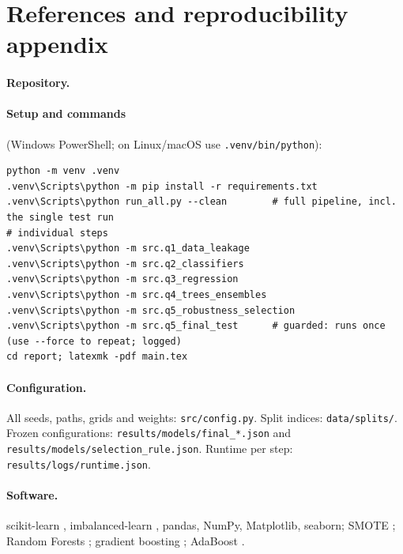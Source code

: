 \section{References and reproducibility appendix}
\label{sec:repro}

\paragraph{Repository.} \RepoURL

\paragraph{Setup and commands} (Windows PowerShell; on Linux/macOS use \texttt{.venv/bin/python}):
{\footnotesize
\begin{verbatim}
python -m venv .venv
.venv\Scripts\python -m pip install -r requirements.txt
.venv\Scripts\python run_all.py --clean        # full pipeline, incl. the single test run
# individual steps
.venv\Scripts\python -m src.q1_data_leakage
.venv\Scripts\python -m src.q2_classifiers
.venv\Scripts\python -m src.q3_regression
.venv\Scripts\python -m src.q4_trees_ensembles
.venv\Scripts\python -m src.q5_robustness_selection
.venv\Scripts\python -m src.q5_final_test      # guarded: runs once (use --force to repeat; logged)
cd report; latexmk -pdf main.tex
\end{verbatim}
}

\paragraph{Configuration.} All seeds, paths, grids and weights: \nolinkurl{src/config.py}. Split indices:
\nolinkurl{data/splits/}. Frozen configurations: \nolinkurl{results/models/final_*.json} and
\nolinkurl{results/models/selection_rule.json}. Runtime per step: \nolinkurl{results/logs/runtime.json}.

\paragraph{Software.} scikit-learn \cite{pedregosa2011scikit}, imbalanced-learn \cite{lemaitre2017imbalanced},
pandas, NumPy, Matplotlib, seaborn; SMOTE \cite{chawla2002smote}; Random Forests \cite{breiman2001random};
gradient boosting \cite{friedman2001greedy}; AdaBoost \cite{freund1997decision}.
